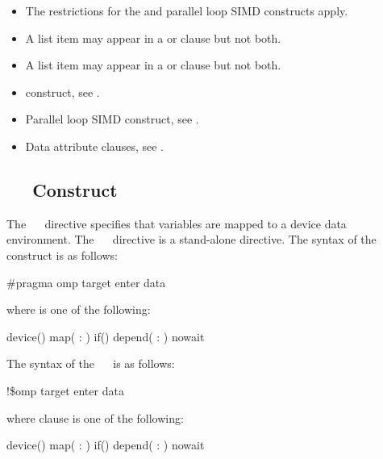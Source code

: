 \restrictions
\begin{itemize}
\item The restrictions for the  and parallel loop SIMD constructs apply.
\item A list item may appear in a  or  clause but not both.
\item A list item may appear in a  or  clause but not both.
\end{itemize}

\crossreferences
\begin{itemize}
\item {} construct, see 
.

\item Parallel loop SIMD construct, see 
.

\item Data attribute clauses, see .
\end{itemize}


\subsection{~~ Construct}
\label{subsec:target enter data Construct}
\summary
The ~~ directive specifies that variables are mapped to a device data environment. The ~~ directive is a stand-alone directive.
\syntax
\ccppspecificstart
The syntax of the ~~ construct is as follows:
\begin{boxedcode}
\#pragma omp target enter data 
\end{boxedcode}
where  is one of the following:
\begin{indentedcodelist}
device()
map(\plc{[ [map-type-modifier[,]] map-type} : \plc{] list})
if()
depend( : )
nowait
\end{indentedcodelist}
\ccppspecificend
\fortranspecificstart
The syntax of the ~~ is as follows:
\begin{boxedcode}
!\$omp target enter data 
\end{boxedcode}
where clause is one of the following:
\begin{indentedcodelist}
device()
map(\plc{[ [map-type-modifier[,]] map-type} : \plc{] list})
if()
depend( : )
nowait
\end{indentedcodelist}
\fortranspecificend


